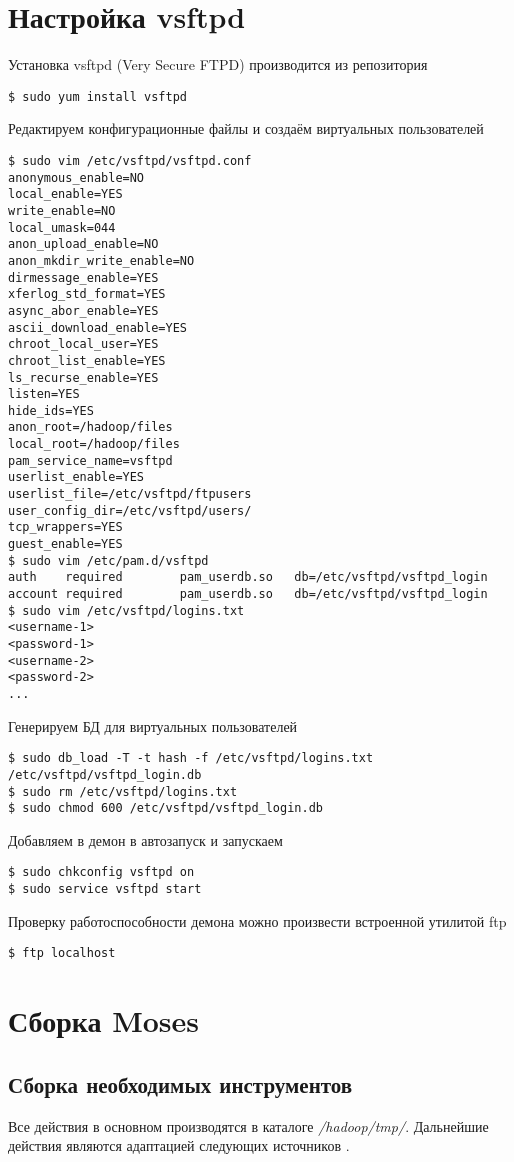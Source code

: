 \section{Настройка vsftpd}
Установка vsftpd (Very Secure FTPD) производится из репозитория
\begin{lstlisting}
$ sudo yum install vsftpd
\end{lstlisting}
Редактируем конфигурационные файлы и создаём виртуальных пользователей
\begin{lstlisting}
$ sudo vim /etc/vsftpd/vsftpd.conf
anonymous_enable=NO
local_enable=YES
write_enable=NO
local_umask=044
anon_upload_enable=NO
anon_mkdir_write_enable=NO
dirmessage_enable=YES
xferlog_std_format=YES
async_abor_enable=YES
ascii_download_enable=YES
chroot_local_user=YES
chroot_list_enable=YES
ls_recurse_enable=YES
listen=YES
hide_ids=YES
anon_root=/hadoop/files
local_root=/hadoop/files
pam_service_name=vsftpd
userlist_enable=YES
userlist_file=/etc/vsftpd/ftpusers
user_config_dir=/etc/vsftpd/users/
tcp_wrappers=YES
guest_enable=YES
$ sudo vim /etc/pam.d/vsftpd
auth    required        pam_userdb.so   db=/etc/vsftpd/vsftpd_login
account required        pam_userdb.so   db=/etc/vsftpd/vsftpd_login
$ sudo vim /etc/vsftpd/logins.txt
<username-1>
<password-1>
<username-2>
<password-2>
...
\end{lstlisting}

Генерируем БД для виртуальных пользователей
\begin{lstlisting}
$ sudo db_load -T -t hash -f /etc/vsftpd/logins.txt /etc/vsftpd/vsftpd_login.db
$ sudo rm /etc/vsftpd/logins.txt
$ sudo chmod 600 /etc/vsftpd/vsftpd_login.db
\end{lstlisting}

Добавляем в демон в автозапуск и запускаем
\begin{lstlisting}
$ sudo chkconfig vsftpd on
$ sudo service vsftpd start
\end{lstlisting}

Проверку работоспособности демона можно произвести встроенной утилитой ftp
\begin{lstlisting}
$ ftp localhost
\end{lstlisting}

\section{Сборка Moses}
\subsection{Сборка необходимых инструментов}
Все действия в основном производятся в каталоге \emph{/hadoop/tmp/}. 
Дальнейшие действия являются адаптацией следующих источников \cite{moses:baseline, moses:dev}.

